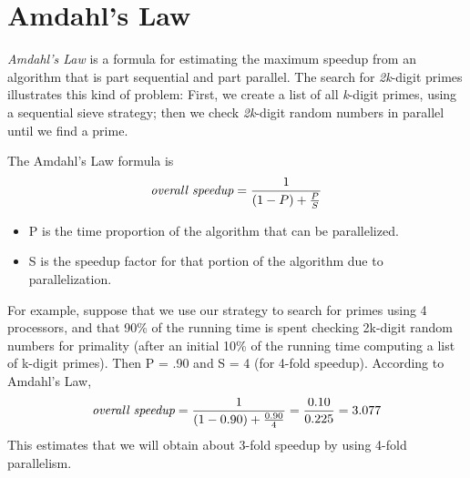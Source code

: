 \documentclass[letterpaper,10pt,english]{sphinxmanual}
\begin{document}
\section{Amdahl's Law}
\label{ParallelSpeedup/ParallelSpeedup:amdahl-s-law}
\emph{Amdahl's Law} is a formula for estimating the maximum speedup from an algorithm that is part sequential and part parallel.  The search for \emph{2k}-digit primes illustrates this kind of problem: First, we create a list of all \emph{k}-digit primes, using a sequential sieve strategy; then we check \emph{2k}-digit random numbers in parallel until we find a prime.

The Amdahl's Law formula is
\begin{gather}
\begin{split}\textit{overall speedup} = \frac{1}{(1-P) +  \frac{P}{S}}\end{split}\notag
\end{gather}\begin{itemize}
\item {} 
P is the time proportion of the algorithm that can be parallelized.

\item {} 
S is the speedup factor for that portion of the algorithm due to parallelization.

\end{itemize}

For example, suppose that we use our strategy to search for primes using 4 processors, and that 90\% of the running time is spent checking 2k-digit random numbers for primality (after an initial 10\% of the running time computing a list of k-digit primes). Then P = .90 and S = 4 (for 4-fold speedup).  According to Amdahl's Law,
\begin{gather}
\begin{split}\textit{overall speedup} = \frac{1}{(1-0.90) + \frac{0.90}{4}} = \frac{0.10}{0.225} = 3.077\end{split}\notag
\end{gather}
This estimates that we will obtain about 3-fold speedup by using 4-fold parallelism.
\end{document}

